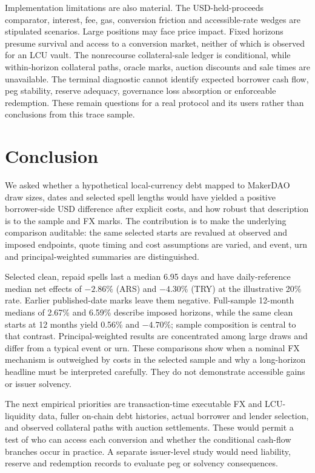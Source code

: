 \documentclass[sn-vancouver,Numbered]{sn-jnl}
\begin{document}
Implementation limitations are also material. The USD-held-proceeds comparator, interest, fee, gas, conversion friction and accessible-rate wedges are stipulated scenarios. Large positions may face price impact. Fixed horizons presume survival and access to a conversion market, neither of which is observed for an LCU vault. The nonrecourse collateral-sale ledger is conditional, while within-horizon collateral paths, oracle marks, auction discounts and sale times are unavailable. The terminal diagnostic cannot identify expected borrower cash flow, peg stability, reserve adequacy, governance loss absorption or enforceable redemption. These remain questions for a real protocol and its users rather than conclusions from this trace sample.

\section{Conclusion}
We asked whether a hypothetical local-currency debt mapped to MakerDAO draw sizes, dates and selected spell lengths would have yielded a positive borrower-side USD difference after explicit costs, and how robust that description is to the sample and FX marks. The contribution is to make the underlying comparison auditable: the same selected starts are revalued at observed and imposed endpoints, quote timing and cost assumptions are varied, and event, urn and principal-weighted summaries are distinguished.

Selected clean, repaid spells last a median 6.95 days and have daily-reference median net effects of $-2.86\%$ (ARS) and $-4.30\%$ (TRY) at the illustrative 20\% rate. Earlier published-date marks leave them negative. Full-sample 12-month medians of 2.67\% and 6.59\% describe imposed horizons, while the same clean starts at 12 months yield 0.56\% and $-4.70\%$; sample composition is central to that contrast. Principal-weighted results are concentrated among large draws and differ from a typical event or urn. These comparisons show when a nominal FX mechanism is outweighed by costs in the selected sample and why a long-horizon headline must be interpreted carefully. They do not demonstrate accessible gains or issuer solvency.

The next empirical priorities are transaction-time executable FX and LCU-liquidity data, fuller on-chain debt histories, actual borrower and lender selection, and observed collateral paths with auction settlements. These would permit a test of who can access each conversion and whether the conditional cash-flow branches occur in practice. A separate issuer-level study would need liability, reserve and redemption records to evaluate peg or solvency consequences.
\end{document}
